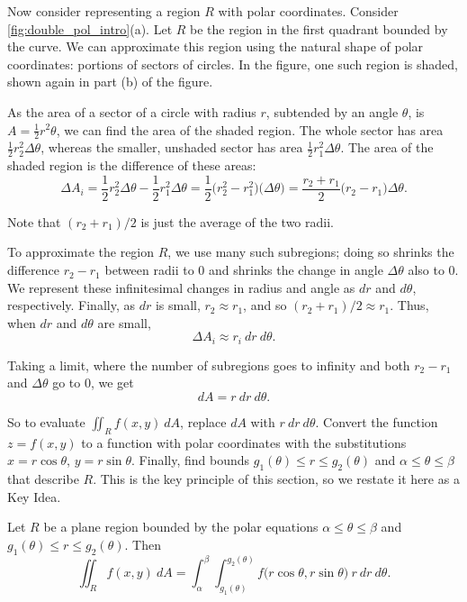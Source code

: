 Now consider representing a region $R$ with polar coordinates. Consider \autoref{fig:double_pol_intro}(a). Let $R$ be the region in the first quadrant bounded by the curve. We can approximate this region using the natural shape of polar coordinates: portions of sectors of circles. In the figure, one such region is shaded, shown again in part (b) of the figure.

As the area of a sector of a circle with radius $r$, subtended by an angle $\theta$, is $A = \frac12r^2\theta$, we can find the area of the shaded region. The whole sector has area $\frac12r_2^2\Delta \theta$, whereas the smaller, unshaded sector has area $\frac12r_1^2\Delta \theta$. The area of the shaded region is the difference of these areas:
\[\Delta A_i = \frac12r_2^2\Delta\theta-\frac12r_1^2\Delta\theta = \frac12\bigl(r_2^2-r_1^2\bigr)\bigl(\Delta\theta\bigr) = \frac{r_2+r_1}{2}\bigl(r_2-r_1\bigr)\Delta\theta.\]

Note that $(r_2+r_1)/2$ is just the average of the two radii. 

To approximate the region $R$, we use many such subregions; doing so shrinks the difference $r_2-r_1$ between radii to 0 and shrinks the change in angle $\Delta \theta$ also to 0. We represent these infinitesimal changes in radius and angle as $dr$ and $d\theta$, respectively. Finally, as $dr$ is small, $r_2\approx r_1$, and so $(r_2+r_1)/2\approx r_1$. Thus, when $dr$ and $d\theta$ are small, 
\[\Delta A_i \approx r_i\ dr\ d\theta.\]

Taking a limit, where the number of subregions goes to infinity and both $r_2-r_1$ and $\Delta\theta$ go to 0, we get \[dA = r\ dr\ d\theta.\]

So to evaluate $\iint_Rf(x,y)\ dA$, replace $dA$ with $r\ dr\ d\theta$. Convert the function $z=f(x,y)$ to a function with polar coordinates with the substitutions $x=r\cos\theta$, $y=r\sin\theta$. Finally, find bounds $g_1(\theta)\leq r\leq g_2(\theta)$ and $\alpha\leq\theta\leq\beta$ that describe $R$. This is the key principle of this section, so we restate it here as a Key Idea.

\begin{keyidea}\label{idea:doublepol}
Let $R$ be a plane region bounded by the polar equations $\alpha\leq\theta\leq\beta$ and  $g_1(\theta)\leq r\leq g_2(\theta)$. Then
\[\iint_Rf(x,y)\ dA = \int_\alpha^\beta\int_{g_1(\theta)}^{g_2(\theta)} f\bigl(r\cos\theta,r\sin\theta\bigr)\ r\ dr\ d\theta.\]
\end{keyidea}

